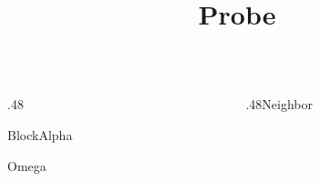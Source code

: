 \documentclass[11pt,aspectratio=169]{beamer}
\title{Probe}
\date{}
\begin{document}
\begin{frame}\begin{columns}[onlytextwidth]\begin{column}{.48\textwidth}\begin{block}{Block}Alpha\par {}\par Omega\end{block}\end{column}\begin{column}{.48\textwidth}Neighbor\end{column}\end{columns}\end{frame}
\end{document}

